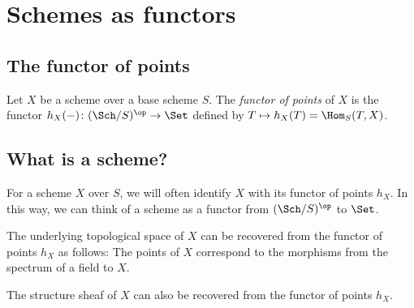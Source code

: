 \section{Schemes as functors}


\subsection{The functor of points}

    Let \(X\) be a scheme over a base scheme \(S\).
    The \emph{functor of points} of \(X\) is the functor \(h_X(-)\colon (\Sch/S)^{\op} \to \Set\) defined by \(T \mapsto h_X(T) = \Hom_S(T, X)\).


\subsection{What is a scheme?}

    For a scheme \(X\) over \(S\), we will often identify \(X\) with its functor of points \(h_X\).
    In this way, we can think of a scheme as a functor from \((\Sch/S)^{\op}\) to \(\Set\).

    The underlying topological space of \(X\) can be recovered from the functor of points \(h_X\) as follows:
    The points of \(X\) correspond to the morphisms from the spectrum of a field to \(X\).

    The structure sheaf of \(X\) can also be recovered from the functor of points \(h_X\).